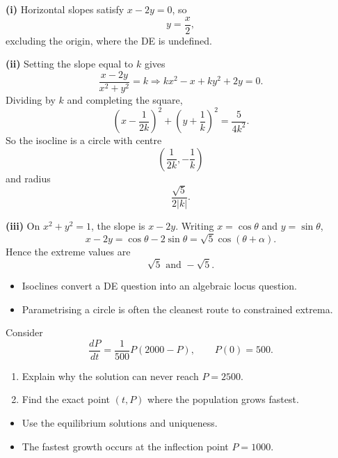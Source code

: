 \begin{solution}
\textbf{(i)} Horizontal slopes satisfy $x-2y=0$, so
\[
\boxed{y=\frac{x}{2}},
\]
excluding the origin, where the DE is undefined.

\textbf{(ii)} Setting the slope equal to $k$ gives
\[
\frac{x-2y}{x^2+y^2}=k
\Rightarrow
kx^2-x+ky^2+2y=0.
\]
Dividing by $k$ and completing the square,
\[
\left(x-\frac{1}{2k}\right)^2+\left(y+\frac1k\right)^2=\frac{5}{4k^2}.
\]
So the isocline is a circle with centre
\[
\left(\frac{1}{2k},-\frac1k\right)
\]
and radius
\[
\frac{\sqrt5}{2|k|}.
\]

\textbf{(iii)} On $x^2+y^2=1$, the slope is $x-2y$. Writing $x=\cos\theta$ and $y=\sin\theta$,
\[
x-2y=\cos\theta-2\sin\theta=\sqrt5\cos(\theta+\alpha).
\]
Hence the extreme values are
\[
\boxed{\sqrt5 \text{ and } -\sqrt5.}
\]
\end{solution}

\begin{takeaways}
\begin{itemize}[leftmargin=*]
    \item Isoclines convert a DE question into an algebraic locus question.
    \item Parametrising a circle is often the cleanest route to constrained extrema.
\end{itemize}
\end{takeaways}

\begin{problem}
Consider
\[
\frac{dP}{dt}=\frac1{500}P(2000-P), \qquad P(0)=500.
\]
\begin{enumerate}
    \item[\textbf{i}] Explain why the solution can never reach $P=2500$.
    \item[\textbf{ii}] Find the exact point $(t,P)$ where the population grows fastest.
\end{enumerate}
\end{problem}

\begin{hint}
\begin{itemize}[leftmargin=*]
    \item Use the equilibrium solutions and uniqueness.
    \item The fastest growth occurs at the inflection point $P=1000$.
\end{itemize}
\end{hint}

